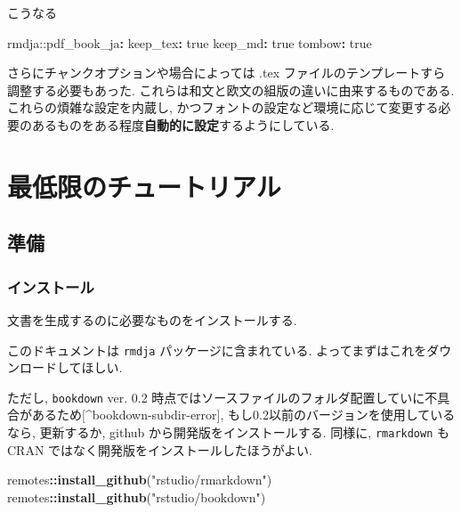 \documentclass[
  nomag]{bxjsbook}
\newenvironment{Shaded}{\begin{snugshade}}{\end{snugshade}}
\newcommand{\AttributeTok}[1]{\textcolor[rgb]{0.77,0.63,0.00}{#1}}
\newcommand{\CharTok}[1]{\textcolor[rgb]{0.31,0.60,0.02}{#1}}
\newcommand{\FunctionTok}[1]{\textcolor[rgb]{0.00,0.00,0.00}{#1}}
\newcommand{\KeywordTok}[1]{\textcolor[rgb]{0.13,0.29,0.53}{\textbf{#1}}}
\newcommand{\NormalTok}[1]{#1}
\newcommand{\OperatorTok}[1]{\textcolor[rgb]{0.81,0.36,0.00}{\textbf{#1}}}
\newcommand{\StringTok}[1]{\textcolor[rgb]{0.31,0.60,0.02}{#1}}
\theoremstyle{definition}
\theoremstyle{definition}
\theoremstyle{definition}
\theoremstyle{remark}
\begin{document}
こうなる

\begin{Shaded}
\begin{Highlighting}[]
\AttributeTok{rmdja:}\FunctionTok{:pdf\_book\_ja}\KeywordTok{:}
\AttributeTok{  }\FunctionTok{keep\_tex}\KeywordTok{:}\AttributeTok{ }\CharTok{true}
\AttributeTok{  }\FunctionTok{keep\_md}\KeywordTok{:}\AttributeTok{ }\CharTok{true}
\AttributeTok{  }\FunctionTok{tombow}\KeywordTok{:}\AttributeTok{ }\CharTok{true}
\end{Highlighting}
\end{Shaded}

さらにチャンクオプションや場合によっては .tex
ファイルのテンプレートすら調整する必要もあった.
これらは和文と欧文の組版の違いに由来するものである.
これらの煩雑な設定を内蔵し,
かつフォントの設定など環境に応じて変更する必要のあるものをある程度\textbf{自動的に設定}するようにしている.

\hypertarget{part-ux6700ux4f4eux9650ux306eux30c1ux30e5ux30fcux30c8ux30eaux30a2ux30eb}{%
\part{
最低限のチュートリアル}\label{part-ux6700ux4f4eux9650ux306eux30c1ux30e5ux30fcux30c8ux30eaux30a2ux30eb}}

\hypertarget{ux6e96ux5099}{%
\chapter{準備}\label{ux6e96ux5099}}

\hypertarget{ux30a4ux30f3ux30b9ux30c8ux30fcux30eb}{%
\section{インストール}\label{ux30a4ux30f3ux30b9ux30c8ux30fcux30eb}}

文書を生成するのに必要なものをインストールする.

このドキュメントは \texttt{rmdja} パッケージに含まれている.
よってまずはこれをダウンロードしてほしい.

ただし, \texttt{bookdown} ver. 0.2
時点ではソースファイルのフォルダ配置していに不具合があるため{[}\^{}bookdown-subdir-error{]},
もし0.2以前のバージョンを使用しているなら, 更新するか, github
から開発版をインストールする. 同様に, \texttt{rmarkdown} も CRAN
ではなく開発版をインストールしたほうがよい.

\begin{Shaded}
\begin{Highlighting}[numbers=left,,]
\NormalTok{remotes}\OperatorTok{::}\KeywordTok{install\_github}\NormalTok{(}\StringTok{"rstudio/rmarkdown"}\NormalTok{)}
\NormalTok{remotes}\OperatorTok{::}\KeywordTok{install\_github}\NormalTok{(}\StringTok{"rstudio/bookdown"}\NormalTok{)}
\end{Highlighting}
\end{Shaded}
\end{document}
